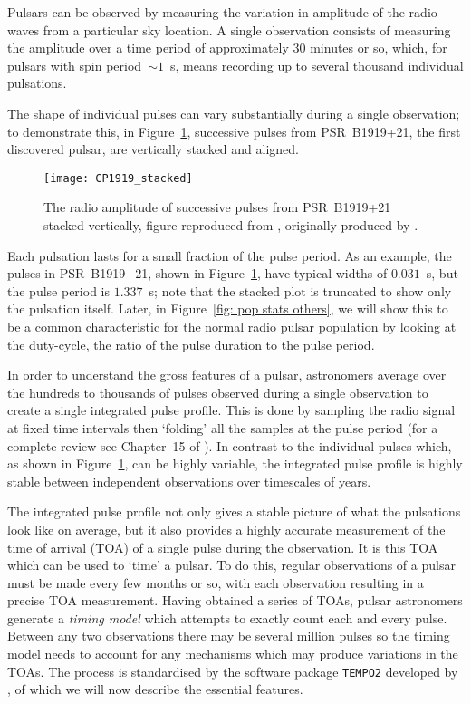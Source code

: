 Pulsars can be observed by measuring the variation in amplitude of the radio
waves from a particular sky location. A single observation consists of
measuring the amplitude over a time period of approximately $30$ minutes or so,
which, for pulsars with spin period~$\sim1$~s, means recording up to several
thousand individual pulsations.

The shape of individual pulses can vary substantially during a single
observation; to demonstrate this, in Figure~\ref{fig: CP1919 stacked},
successive pulses from PSR~B1919+21, the first discovered pulsar, are
vertically stacked and aligned.
\begin{figure}[htb]
\centering
\texttt{[image: CP1919\_stacked]}
\caption{The radio amplitude of successive pulses from PSR~B1919+21 stacked
vertically, figure reproduced from \citet{mitton1977cambridge}, originally
produced by \citet{craft1970}.}
\label{fig: CP1919 stacked}
\end{figure}
Each pulsation lasts for a small fraction of the pulse period. As an example,
the pulses in PSR~B1919+21, shown in Figure~\ref{fig: CP1919 stacked}, have
typical widths of $0.031$~s, but the pulse period is $1.337$~s; note that the
stacked plot is truncated to show only the pulsation itself. Later, in
Figure~\ref{fig: pop stats others}, we will show this to be a common
characteristic for the normal radio pulsar population by looking at the
duty-cycle, the ratio of the pulse duration to the pulse period.

In order to understand the gross features of a pulsar, astronomers average over
the hundreds to thousands of pulses observed during a single observation to
create a single integrated pulse profile. This is done by sampling the radio
signal at fixed time intervals then `folding' all the samples at the pulse
period (for a complete review see Chapter~15 of \citet{Lyne2012book}). In contrast to the
individual pulses which, as shown in Figure~\ref{fig: CP1919 stacked}, can be
highly variable, the integrated pulse profile is highly stable between
independent observations over timescales of years.

The integrated pulse profile not only gives a stable picture of what the
pulsations look like on average, but it also provides a highly accurate
measurement of the time of arrival (TOA) of a single pulse during the
observation. It is this TOA
which can be used to `time' a pulsar. To do this, regular observations of a
pulsar must be made every few months or so, with each observation resulting in a
precise TOA measurement. Having obtained a series of TOAs, pulsar astronomers
generate a \emph{timing model} which attempts to exactly count each and every
pulse. Between any two observations there may be several million pulses so the
timing model needs to account for any mechanisms which may produce variations
in the TOAs.  The process is standardised by the software package
\texttt{TEMPO2} developed by \citet{Hobbs2006}, of which we will now describe the
essential features.

